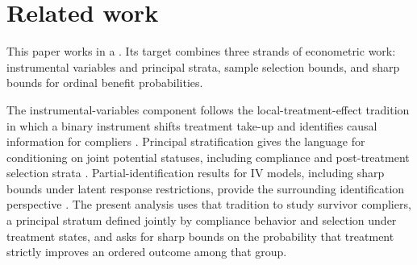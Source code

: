 \documentclass[11pt]{article}
\begin{document}
\section{Related work}\label{sec:related-literature}

This paper works in a . Its target combines three strands of econometric work: instrumental variables and principal strata, sample selection bounds, and sharp bounds for ordinal benefit probabilities.

The instrumental-variables component follows the local-treatment-effect tradition in which a binary instrument shifts treatment take-up and identifies causal information for compliers \citep{ImbensAngrist1994,AngristImbensRubin1996}. Principal stratification gives the language for conditioning on joint potential statuses, including compliance and post-treatment selection strata \citep{FrangakisRubin2002}. Partial-identification results for IV models, including sharp bounds under latent response restrictions, provide the surrounding identification perspective \citep{BalkePearl1997,Manski1990,Manski1997,ManskiPepper2000,Manski2003}. The present analysis uses that tradition to study survivor compliers, a principal stratum defined jointly by compliance behavior and selection under treatment states, and asks for sharp bounds on the probability that treatment strictly improves an ordered outcome among that group.
\end{document}
